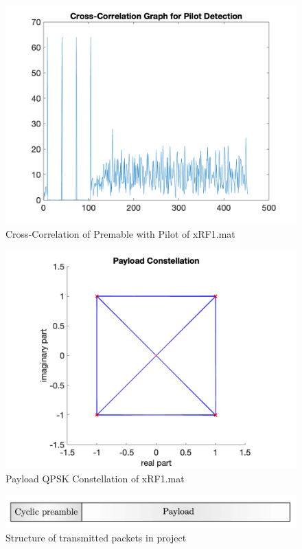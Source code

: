 \begin{figure}[h!]
    \centering
    \includegraphics[scale=0.5]{figures/cross-correlation-parti.png}
    \caption{Cross-Correlation of Premable with Pilot of xRF1.mat}
    \label{fig:cross-corr-parti}
\end{figure}
\begin{figure}[h!]
    \centering
    \includegraphics[scale=0.5]{figures/payload-constellation-parti.png}
    \caption{Payload QPSK Constellation of xRF1.mat}
    \label{fig:payload-constellation-parti}
\end{figure}
\begin{figure}[h!]
    \centering
    \includegraphics[scale=0.7]{figures/data_sequence.png}
    \caption{Structure of transmitted packets in project}
    \label{fig:data_sequence}
\end{figure}
